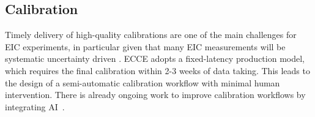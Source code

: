 \subsection{Calibration}












Timely delivery of high-quality calibrations are one of the main challenges for EIC experiments, in particular given that many EIC measurements will be systematic uncertainty driven \cite{YellowReport}. ECCE adopts a fixed-latency production model, which requires the final calibration within 2-3 weeks of data taking. This leads to the design of a semi-automatic calibration workflow with minimal human intervention. There is already ongoing work to improve calibration workflows by integrating AI~\cite{Jeske:2022nws}.

